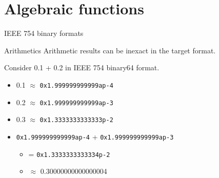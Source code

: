 \documentclass{beamer}
\begin{document}

\section{Algebraic functions}
\begin{frame}{IEEE 754 binary formats}
\end{frame}

\begin{frame}{Arithmetics}
    Arithmetic results can be inexact in the target format.
    
    \begin{example}
        Consider 0.1 + 0.2 in IEEE 754 binary64 format.

        \begin{itemize}
            \item 0.1 $\approx$ \texttt{0x1.999999999999ap-4}
            \item 0.2 $\approx$ \texttt{0x1.999999999999ap-3}
            \item 0.3 $\approx$ \texttt{0x1.3333333333333p-2}
            \item \texttt{0x1.999999999999ap-4} + \texttt{0x1.999999999999ap-3}
                \begin{itemize}
                    \item[] = \texttt{0x1.3333333333334p-2}
                    \item[] $\approx$ 0.30000000000000004
                \end{itemize}
        \end{itemize}
    \end{example}
\end{frame}
\end{document}
